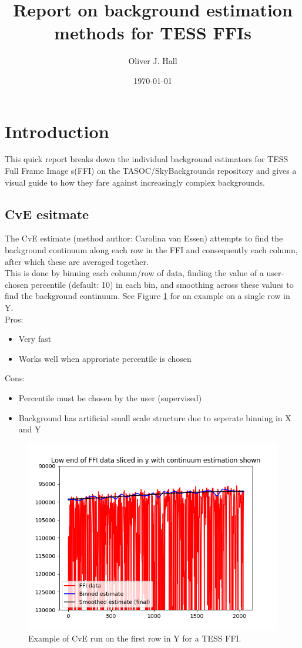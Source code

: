 \documentclass[10pt, a4paper]{article}
\title{Report on background estimation methods for TESS FFIs}
\author{Oliver J. Hall}
\date{\today}
\begin{document}
\maketitle
\tableofcontents
\clearpage

\section{Introduction}
This quick report breaks down the individual background estimators for TESS Full Frame Image s(FFI) on the TASOC/SkyBackgrounds repository and gives a visual guide to how they fare against increasingly complex backgrounds.

\subsection{CvE esitmate}
The CvE estimate (method author: Carolina van Essen) attempts to find the background continuum along each row in the FFI and consequently each column, after which these are averaged together.\\

This is done by binning each column/row of data, finding the value of a user-chosen percentile (default: 10) in each bin, and smoothing across these values to find the background continuum. See Figure \ref{fig:cve} for an example on a single row in Y.\\

Pros:
\begin{itemize}
\item Very fast
\item Works well when approriate percentile is chosen
\end{itemize}

Cons:
\begin{itemize}
\item Percentile must be chosen by the user (supervised)
\item Background has artificial small scale structure due to seperate binning in X and Y
\end{itemize}

\begin{figure}[h!]
\includegraphics[width=\textwidth]{CvE_example}
\caption{Example of CvE run on the first row in Y for a TESS FFI.}
\label{fig:cve}
\end{figure}
\end{document}
